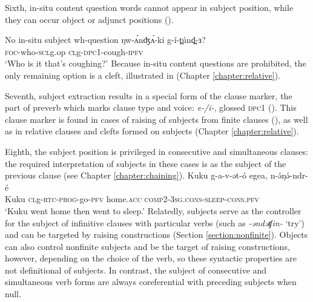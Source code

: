 Sixth, in-situ content question words cannot appear in subject position, while they can occur object or adjunct positions ().

\ea No in-situ subject wh-question \label{ex:ch12:3}
 \label{ex:ch12:3a}
\ex  \gll ŋw-ʌ́nʤʌ́-ki	g-í-t̪únd̪-ɜ?	            \\
		\textsc{foc}-who-\textsc{scl}g.{op}	\textsc{cl}g-\textsc{dpc1}-cough-\textsc{ipfv}\\
    \glt `Who is it that's coughing?'\label{ex:ch12:3b}
    \z 
\z 
Because in-situ content questions are prohibited, the only remaining option is a cleft, illustrated in  (Chapter \ref{chapter:relative}).

Seventh, subject extraction results in a special form of the clause marker, the part of preverb which marks clause type and voice: \textit{e-/i-}, glossed \textsc{dpc1} (). This clause marker is found in cases of raising of subjects from finite clauses (), as well as in relative clauses and clefts formed on subjects (Chapter \ref{chapter:relative}).

Eighth, the subject position is privileged in consecutive and simultaneous clauses: the required interpretation of subjects in these cases is as the subject of the previous clause (see Chapter \ref{chapter:chaining}).
\ea \gll Kuku g-a-v-ət-ó egea, n-ə́ŋə́-ndr-é\\
Kuku \textsc{cl}g-\textsc{rtc}-\textsc{prog}-go-\textsc{pfv} home.\textsc{acc} \textsc{comp2}-\textsc{3sg.cons}-\textsc{sleep}-\textsc{cons.pfv}\\
`Kuku went home then went to sleep.'
\z 
Relatedly, subjects serve as the controller for the subject of infinitive clauses with particular verbs (such as \textit{-əndəʧin-} `try') and can be targeted by raising constructions (Section \ref{section:nonfinite}). Objects can also control nonfinite subjects and be the target of raising constructions, however, depending on the choice of the verb, so these syntactic properties are not definitional of subjects. In contrast, the subject of consecutive and simultaneous verb forms are always coreferential with preceding subjects when null.



